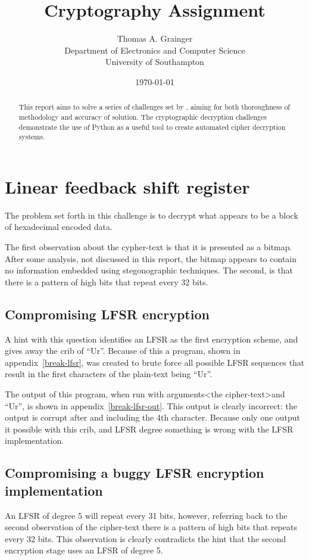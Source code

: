 \documentclass[pdftex, 12pt, a4paper]{article}
\title{Cryptography Assignment}
\author{
    Thomas A. Grainger \\
    Department of Electronics and Computer Science\\
    University of Southampton\\
}
\date{\today}
\begin{document}
\maketitle

\begin{abstract}
This report aims to solve a series of challenges set by \textcite{instructions},
aiming for both thoroughness of methodology and accuracy of solution. The
cryptographic decryption challenges demonstrate the use of Python as a useful
tool to create automated cipher decryption systems.
\end{abstract}

\tableofcontents
\pagebreak
\section{Linear feedback shift register}

The problem set forth in this challenge is to decrypt what appears to be a block
of hexadecimal encoded data.

The first observation about the cypher-text is that it is presented as a bitmap.
After some analysis, not discussed in this report, the bitmap appears to
contain no information embedded using stegonographic techniques.  The second, is
that there is a pattern of high bits that repeat every 32 bits.

\subsection{Compromising LFSR encryption}
A hint with this question identifies an LFSR as the first encryption scheme, and
gives away the crib of ``Ur''.  Because of this a program, shown in
appendix~\ref{break-lfsr}, was created to brute force all possible LFSR
sequences that result in the first characters of the plain-text being ``Ur''.

The output of this program, when run with arguments\textless{}the
cipher-text\textgreater and ``Ur'', is shown in appendix~\ref{break-lfsr-out}.
This output is clearly incorrect: the output is corrupt after and including the
4th character.  Because only one output it possible with this crib, and LFSR
degree something is wrong with the LFSR implementation.

\subsection{Compromising a buggy LFSR encryption implementation}
An LFSR of degree 5 will repeat every 31 bits, however, referring back to the
second observation of the cipher-text there is a pattern of high bits that
repeats every 32 bits. This observation is clearly contradicts the hint that the
second encryption stage uses an LFSR of degree 5.
\end{document}
